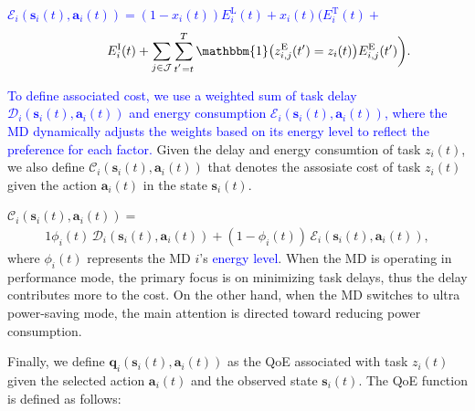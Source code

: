 \documentclass[10pt, journal,letterpaper]{IEEEtran}
\begin{document}
\textcolor{blue}{$\mathcal{E}_i(\boldsymbol{s}_i(t),\boldsymbol{a}_i(t)) = (1-x_i(t)) E_i^{\text{L}}(t)+x_i(t) \bigg( E_i^{\text{T}}(t) + $
\begin{alignat}{1}
	\hspace{1.2cm}    E_i^{\text{I}}(t) +  \sum\limits_{j \in \mathcal{J}}  \sum\limits_{t^{'}=t}^{T}\mathbbm{1}\big(z_{i,j}^{\text{E}}(t') = z_i(t)\big)
	  E_{i,j}^{\text{E}}(t')\bigg).
	\label{22}  
\end{alignat}}

\textcolor{blue}{To define associated cost, we use a weighted sum of task delay $\mathcal{D}_i(\boldsymbol{s}_i(t),\boldsymbol{a}_i(t))$ and energy consumption $\mathcal{E}_i(\boldsymbol{s}_i(t),\boldsymbol{a}_i(t))$, where the MD dynamically adjusts the weights based on its energy level to reflect the preference for each factor.}
Given the delay and energy consumtion of task $z_i(t)$, we also define $\mathcal{C}_i(\boldsymbol{s}_i(t),\boldsymbol{a}_i(t))$ that denotes the assosiate cost of task $z_i(t)$ given the action $\boldsymbol{a}_i(t)$ in the state $\boldsymbol{s}_i(t)$. \vspace{1.7mm}


$\mathcal{C}_i(\boldsymbol{s}_i(t),\boldsymbol{a}_i(t)) =$
\begin{alignat}{1}
	\phi_i(t) \, \mathcal{D}_i(\boldsymbol{s}_i(t),\boldsymbol{a}_i(t)) +(1-\phi_i(t)) \, \mathcal{E}_i(\boldsymbol{s}_i(t),\boldsymbol{a}_i(t)),
	\label{23}  
\end{alignat}
where $\phi_i(t)$ represents the MD $i$'s \textcolor{blue}{energy level}. When the MD is operating in performance mode, the primary focus is on minimizing task delays, thus the delay contributes more to the cost. On the other hand, when the MD switches to ultra power-saving mode, the main attention is directed toward reducing power consumption.

Finally, we define $\boldsymbol{q}_i(\boldsymbol{s}_i(t),\boldsymbol{a}_i(t))$ as the QoE associated with task $z_i(t)$ given the selected action $\boldsymbol{a}_i(t)$ and the observed state $\boldsymbol{s}_i(t)$. The QoE function is defined as follows:\vspace{1.7mm}
\end{document}
